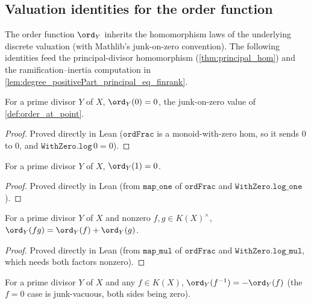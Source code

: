 \subsection{Valuation identities for the order function}
\label{subsec:order_identities}
The order function \(\ord_Y\) inherits the homomorphism laws of the
underlying discrete valuation (with Mathlib's junk-on-zero convention). The
following identities feed the principal-divisor homomorphism
(\ref{thm:principal_hom}) and the ramification--inertia computation in
\ref{lem:degree_positivePart_principal_eq_finrank}.
\begin{lemma}
  \label{lem:order_zero}
  For a prime divisor \(Y\) of \(X\), \(\ord_Y(0) = 0\), the junk-on-zero
  value of \ref{def:order_at_point}.
\end{lemma}
\begin{proof}
  Proved directly in Lean (\(\texttt{ordFrac}\) is a monoid-with-zero hom,
  so it sends \(0\) to \(0\), and \(\texttt{WithZero.log}\,0 = 0\)).
\end{proof}
\begin{lemma}
  \label{lem:order_one}
  For a prime divisor \(Y\) of \(X\), \(\ord_Y(1) = 0\).
\end{lemma}
\begin{proof}
  Proved directly in Lean (from \(\texttt{map\_one}\) of \(\texttt{ordFrac}\)
  and \(\texttt{WithZero.log\_one}\)).
\end{proof}
\begin{lemma}
  \label{lem:order_mul_of_ne_zero}
  For a prime divisor \(Y\) of \(X\) and nonzero
  \(f, g \in K(X)^{\times}\),
  \(\ord_Y(fg) = \ord_Y(f) + \ord_Y(g)\).
\end{lemma}
\begin{proof}
  Proved directly in Lean (from \(\texttt{map\_mul}\) of \(\texttt{ordFrac}\)
  and \(\texttt{WithZero.log\_mul}\), which needs both factors nonzero).
\end{proof}
\begin{lemma}
  \label{lem:order_inv}
  For a prime divisor \(Y\) of \(X\) and any \(f \in K(X)\),
  \(\ord_Y(f^{-1}) = -\ord_Y(f)\) (the \(f = 0\) case is junk-vacuous, both
  sides being zero).
\end{lemma}
